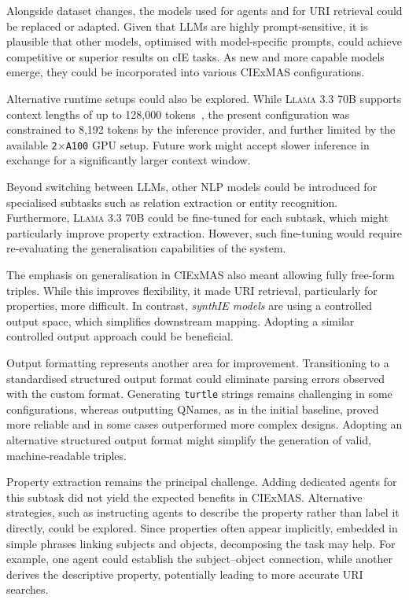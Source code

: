 \documentclass[a4paper,oneside,bibliography=totoc]{scrbook}
\begin{document}
Alongside dataset changes, the models used for agents and for \ac{URI} retrieval could be replaced or adapted. Given that \acp{LLM} are highly prompt-sensitive, it is plausible that other models, optimised with model-specific prompts, could achieve competitive or superior results on \ac{cIE} tasks. As new and more capable models emerge, they could be incorporated into various CIExMAS configurations.

Alternative runtime setups could also be explored. While \textsc{Llama 3.3 70B} supports context lengths of up to 128{,}000 tokens~\cite{Meta2024}, the present configuration was constrained to 8{,}192 tokens by the inference provider, and further limited by the available \texttt{2$\times$A100} GPU setup. Future work might accept slower inference in exchange for a significantly larger context window.

Beyond switching between \acp{LLM}, other \ac{NLP} models could be introduced for specialised subtasks such as relation extraction or entity recognition. Furthermore, \textsc{Llama 3.3 70B} could be fine-tuned for each subtask, which might particularly improve property extraction. However, such fine-tuning would require re-evaluating the generalisation capabilities of the system.

The emphasis on generalisation in CIExMAS also meant allowing fully free-form triples. While this improves flexibility, it made \ac{URI} retrieval, particularly for properties, more difficult. In contrast, \textit{synthIE models} are using a controlled output space, which simplifies downstream mapping. Adopting a similar controlled output approach could be beneficial.

Output formatting represents another area for improvement. Transitioning to a standardised structured output format could eliminate parsing errors observed with the custom format. Generating \texttt{turtle} strings remains challenging in some configurations, whereas outputting QNames, as in the initial baseline, proved more reliable and in some cases outperformed more complex designs. Adopting an alternative structured output format might simplify the generation of valid, machine-readable triples.

Property extraction remains the principal challenge. Adding dedicated agents for this subtask did not yield the expected benefits in CIExMAS. Alternative strategies, such as instructing agents to describe the property rather than label it directly, could be explored. Since properties often appear implicitly, embedded in simple phrases linking subjects and objects, decomposing the task may help. For example, one agent could establish the subject–object connection, while another derives the descriptive property, potentially leading to more accurate \ac{URI} searches.
\end{document}
